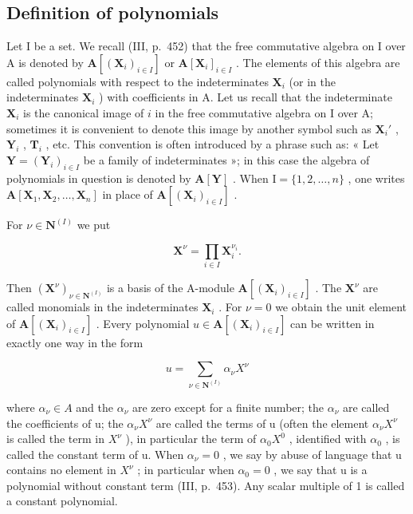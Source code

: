 \subsection{Definition of polynomials}

Let I be a set. We recall (III, p.~452) that the free commutative algebra on I over A is denoted by \(\mathbf{A}[(\mathbf{X}_i)_{i\in I}]\) or \(\mathbf{A}[\mathbf{X}_i]_{i\in I}\) . The elements of this algebra are called polynomials with respect to the indeterminates \(\mathbf{X}_i\) (or in the indeterminates \(\mathbf{X}_i\) ) with coefficients in A. Let us recall that the indeterminate \(\mathbf{X}_i\) is the canonical image of \(i\) in the free commutative algebra on I over A; sometimes it is convenient to denote this image by another symbol such as \(\mathbf{X}_i'\) , \(\mathbf{Y}_i\) , \(\mathbf{T}_i\) , etc. This convention is often introduced by a phrase such as: « Let \(\mathbf{Y} = (\mathbf{Y}_i)_{i\in I}\) be a family of indeterminates »; in this case the algebra of polynomials in question is denoted by \(\mathbf{A}[\mathbf{Y}]\) . When \(\mathrm{I} = \{1,2,\dots,n\}\) , one writes \(\mathbf{A}[\mathbf{X}_1,\mathbf{X}_2,\dots,\mathbf{X}_n]\) in place of \(\mathbf{A}[(\mathbf{X}_i)_{i\in I}]\) .

For \(\nu \in \mathbf{N}^{(I)}\) we put

\[
\mathbf {X} ^ {\nu} = \prod_ {i \in I} \mathbf {X} _ {i} ^ {\nu_ {i}}.
\]

Then \((\mathbf{X}^{\nu})_{\nu \in \mathbf{N}^{(I)}}\) is a basis of the A-module \(\mathbf{A}[(\mathbf{X}_i)_{i\in I}]\) . The \(\mathbf{X}^{\nu}\) are called monomials in the indeterminates \(\mathbf{X}_i\) . For \(\nu = 0\) we obtain the unit element of \(\mathbf{A}[(\mathbf{X}_i)_{i\in I}]\) . Every polynomial \(u\in \mathbf{A}[(\mathbf{X}_i)_{i\in I}]\) can be written in exactly one way in the form

\[
u = \sum_ {\nu \in \mathbf {N} ^ {(I)}} \alpha_ {\nu} X ^ {\nu}
\]

where \(\alpha_{\nu}\in A\) and the \(\alpha_{\nu}\) are zero except for a finite number; the \(\alpha_{\nu}\) are called the coefficients of u; the \(\alpha_{\nu}X^{\nu}\) are called the terms of u (often the element \(\alpha_{\nu}X^{\nu}\) is called the term in \(X^{\nu}\) ), in particular the term of \(\alpha_{0}X^{0}\) , identified with \(\alpha_{0}\) , is called the constant term of u. When \(\alpha_{\nu}=0\) , we say by abuse of language that u contains no element in \(X^{\nu}\) ; in particular when \(\alpha_{0}=0\) , we say that u is a polynomial without constant term (III, p.~453). Any scalar multiple of 1 is called a constant polynomial.

